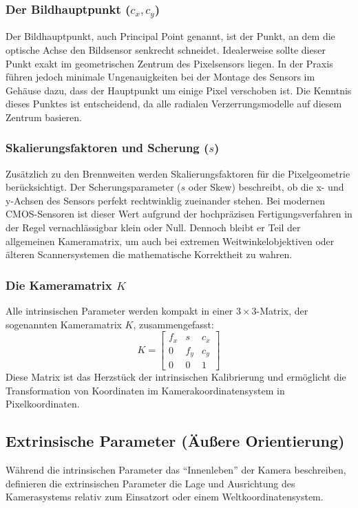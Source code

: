\documentclass[12pt,a4paper,parskip=half]{scrartcl}
\begin{document}
\subsubsection{Der Bildhauptpunkt (\texorpdfstring{$c_x, c_y$}{cx, cy})}
Der Bildhauptpunkt, auch Principal Point genannt, ist der Punkt, an dem die optische Achse den Bildsensor senkrecht schneidet. Idealerweise sollte dieser Punkt exakt im geometrischen Zentrum des Pixelsensors liegen. In der Praxis führen jedoch minimale Ungenauigkeiten bei der Montage des Sensors im Gehäuse dazu, dass der Hauptpunkt um einige Pixel verschoben ist. Die Kenntnis dieses Punktes ist entscheidend, da alle radialen Verzerrungsmodelle auf diesem Zentrum basieren.

\subsubsection{Skalierungsfaktoren und Scherung (\texorpdfstring{$s$}{s})}
Zusätzlich zu den Brennweiten werden Skalierungsfaktoren für die Pixelgeometrie berücksichtigt. Der Scherungsparameter ($s$ oder Skew) beschreibt, ob die x- und y-Achsen des Sensors perfekt rechtwinklig zueinander stehen. Bei modernen CMOS-Sensoren ist dieser Wert aufgrund der hochpräzisen Fertigungsverfahren in der Regel vernachlässigbar klein oder Null. Dennoch bleibt er Teil der allgemeinen Kameramatrix, um auch bei extremen Weitwinkelobjektiven oder älteren Scannersystemen die mathematische Korrektheit zu wahren.

\subsubsection{Die Kameramatrix \texorpdfstring{$K$}{K}}
Alle intrinsischen Parameter werden kompakt in einer $3 \times 3$-Matrix, der sogenannten Kameramatrix $K$, zusammengefasst:
\[
K = \begin{bmatrix} f_x & s & c_x \\ 0 & f_y & c_y \\ 0 & 0 & 1 \end{bmatrix}
\]
Diese Matrix ist das Herzstück der intrinsischen Kalibrierung und ermöglicht die Transformation von Koordinaten im Kamerakoordinatensystem in Pixelkoordinaten.

\subsection{Extrinsische Parameter (Äußere Orientierung)}
Während die intrinsischen Parameter das \enquote{Innenleben} der Kamera beschreiben, definieren die extrinsischen Parameter die Lage und Ausrichtung des Kamerasystems relativ zum Einsatzort oder einem Weltkoordinatensystem. 
\end{document}
